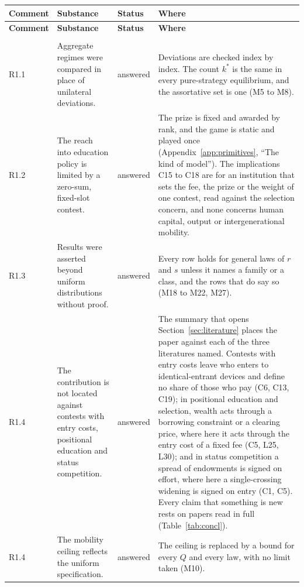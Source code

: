 \footnotesize
\begin{longtable}{@{}P{1.3cm}P{5.7cm}P{1.9cm}P{7.0cm}@{}}
\toprule
\textbf{Comment} & \textbf{Substance} & \textbf{Status} & \textbf{Where} \\
\midrule
\endfirsthead
\toprule
\textbf{Comment} & \textbf{Substance} & \textbf{Status} & \textbf{Where} \\
\midrule
\endhead
\bottomrule
\endfoot
{}\\[2pt]
R1.1 & Aggregate regimes were compared in place of unilateral deviations. &
  answered & Deviations are checked index by index. The count $k^*$ is the
  same in every pure-strategy equilibrium, and the assortative set is one
  (M5 to M8). \\
R1.2 & The reach into education policy is limited by a zero-sum, fixed-slot
  contest. & answered & The prize is fixed and awarded by rank, and the game is
  static and played once (Appendix~\ref{app:primitives}, ``The kind of
  model''). The implications C15 to C18 are for an institution that sets the
  fee, the prize or the weight of one contest, read against the selection
  concern, and none concerns human capital, output or intergenerational
  mobility. \\
R1.3 & Results were asserted beyond uniform distributions without proof. &
  answered & Every row holds for general laws of $r$ and $s$ unless it names a
  family or a class, and the rows that do say so (M18 to M22, M27). \\
R1.4 & The contribution is not located against contests with entry costs,
  positional education and status competition. & answered & The
  summary that opens Section~\ref{sec:literature} places the paper against
  each of the three literatures named. Contests with entry costs leave who
  enters to identical-entrant devices and define no share of those who pay
  (C6, C13, C19); in positional education and selection, wealth acts through a
  borrowing constraint or a clearing price, where here it acts through the
  entry cost of a fixed fee (C5, L25, L30); and in status competition a spread
  of endowments is signed on effort, where here a single-crossing widening is
  signed on entry (C1, C5). Every claim that something is new rests on papers
  read in full (Table~\ref{tab:concl}). \\
R1.4 & The mobility ceiling reflects the uniform specification. & answered &
  The ceiling is replaced by a bound for every $Q$ and every law, with no
  limit taken (M10). \\

\end{longtable}
